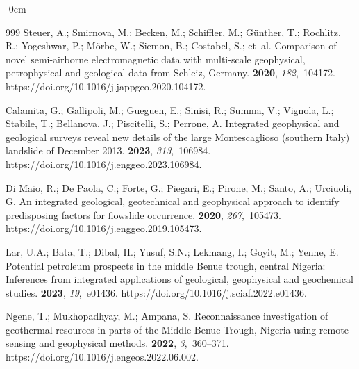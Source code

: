 \documentclass[minerals,article,accept,pdftex,moreauthors]{Definitions/mdpi}
\begin{document}
\begin{adjustwidth}{-\extralength}{0cm}
\begin{thebibliography}{999}
Steuer, A.; Smirnova, M.; Becken, M.; Schiffler, M.; Günther, T.; Rochlitz,
  R.; Yogeshwar, P.; Mörbe, W.; Siemon, B.; Costabel, S.;  et~al.
\newblock Comparison of novel semi-airborne electromagnetic data with
  multi-scale geophysical, petrophysical and geological data from Schleiz,
  Germany.
 {\bf 2020}, {\em 182},~104172.
\newblock https://doi.org/10.1016/j.jappgeo.2020.104172.

Calamita, G.; Gallipoli, M.; Gueguen, E.; Sinisi, R.; Summa, V.; Vignola, L.;
  Stabile, T.; Bellanova, J.; Piscitelli, S.; Perrone, A.
\newblock Integrated geophysical and geological surveys reveal new details of
  the large Montescaglioso (southern Italy) landslide of December 2013.
 {\bf 2023}, {\em 313},~106984.
\newblock https://doi.org/10.1016/j.enggeo.2023.106984.

{Di Maio}, R.; {De Paola}, C.; Forte, G.; Piegari, E.; Pirone, M.; Santo, A.;
  Urciuoli, G.
\newblock An integrated geological, geotechnical and geophysical approach to
  identify predisposing factors for flowslide occurrence.
 {\bf 2020}, {\em 267},~105473.
\newblock https://doi.org/10.1016/j.enggeo.2019.105473.

Lar, U.A.; Bata, T.; Dibal, H.; Yusuf, S.N.; Lekmang, I.; Goyit, M.; Yenne, E.
\newblock Potential petroleum prospects in the middle Benue trough, central
  Nigeria: Inferences from integrated applications of geological, geophysical
  and geochemical studies.
 {\bf 2023}, {\em 19},~e01436.
\newblock https://doi.org/10.1016/j.sciaf.2022.e01436.

Ngene, T.; Mukhopadhyay, M.; Ampana, S.
\newblock Reconnaissance investigation of geothermal resources in parts of the
  Middle Benue Trough, Nigeria using remote sensing and geophysical methods.
 {\bf 2022}, {\em 3},~360--371. %
\newblock 
  https://doi.org/10.1016/j.engeos.2022.06.002.


\end{thebibliography}
\end{adjustwidth}
\end{document}

